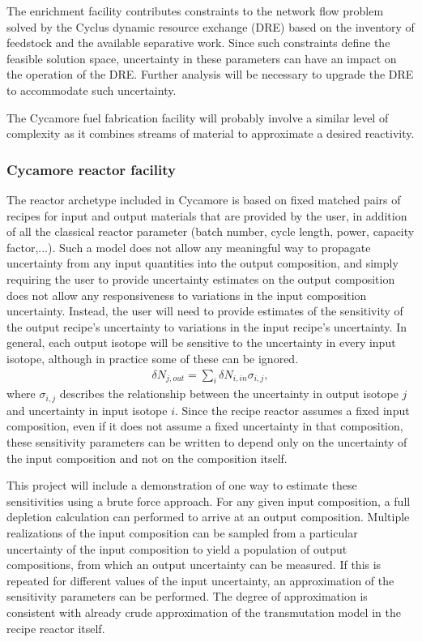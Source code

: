 \documentclass[dvips,12pt]{article}
\newcommand{\unc}[1]
{ \delta #1 }
\begin{document}
The enrichment facility contributes constraints to
the network flow problem solved by the Cyclus
dynamic resource exchange (DRE) based on the
inventory of feedstock and the available
separative work.  Since such constraints define
the feasible solution space, uncertainty in these
parameters can have an impact on the operation of
the DRE.  Further analysis will be necessary to
upgrade the DRE to accommodate such uncertainty.

The Cycamore fuel fabrication facility will
probably involve a similar level of complexity as
it combines streams of material to approximate a
desired reactivity.

\subsubsection{Cycamore reactor facility}

The reactor archetype included in Cycamore is
based on fixed matched pairs of recipes for input
and output materials that are provided by the
user, in addition of all the classical reactor
parameter (batch number, cycle length, power,
capacity factor,...).  Such a model does not allow
any meaningful way to propagate uncertainty from
any input quantities into the output composition,
and simply requiring the user to provide uncertainty 
estimates on the output composition does not allow
any responsiveness to variations in the input
composition uncertainty.
Instead, the user will need to provide estimates
of the sensitivity of the output recipe's uncertainty to
variations in the input recipe's uncertainty.  In
general, each output isotope will be sensitive to
the uncertainty in every input isotope, although
in practice some of these can be ignored.
\begin{align}
\unc{N_{j,out}} = \sum_i \unc{N_{i,in}} \sigma_{i,j},
\end{align}
where $\sigma_{i,j}$ describes the relationship
between the uncertainty in output isotope $j$ and
uncertainty in input isotope $i$.  Since the
recipe reactor assumes a fixed input composition,
even if it does not assume a fixed uncertainty in
that composition, these sensitivity parameters can
be written to depend only on the uncertainty of
the input composition and not on the composition
itself.  

This project will include a demonstration of one
way to estimate these sensitivities using a brute
force approach.  For any given input composition,
a full depletion calculation can performed to
arrive at an output composition.  Multiple
realizations of the input composition can be
sampled from a particular uncertainty of the input
composition to yield a population of output
compositions, from which an output uncertainty can
be measured.  If this is repeated for different
values of the input uncertainty, an approximation
of the sensitivity parameters can be performed.
The degree of approximation is consistent with
already crude approximation of the transmutation
model in the recipe reactor itself.
\end{document}
